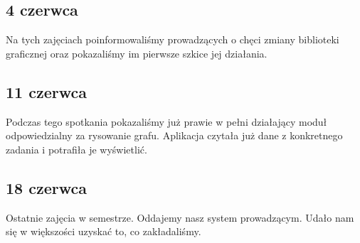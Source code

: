 \subsection{4 czerwca}
Na tych zajęciach poinformowaliśmy prowadzących o chęci zmiany biblioteki graficznej oraz pokazaliśmy im pierwsze szkice jej działania.

\subsection{11 czerwca}
Podczas tego spotkania pokazaliśmy już prawie w pełni działający moduł odpowiedzialny za rysowanie grafu. Aplikacja czytała już dane z konkretnego zadania i potrafiła je wyświetlić.

\subsection{18 czerwca}
Ostatnie zajęcia w semestrze. Oddajemy nasz system prowadzącym. Udało nam się w większości uzyskać to, co zakładaliśmy.